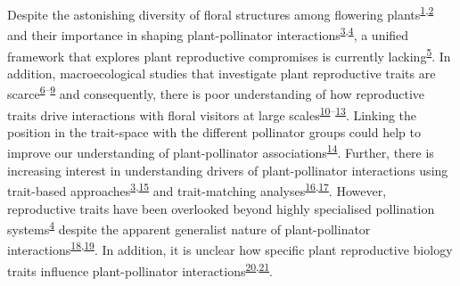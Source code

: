 \documentclass[12pt,a4paper,]{article}
\begin{document}
\doublespacing
\vspace{5mm} \normalsize

Despite the astonishing diversity of floral structures among flowering
plants\textsuperscript{\protect\hyperlink{ref-barrett2002}{1},\protect\hyperlink{ref-schiestl2013}{2}}
and their importance in shaping plant-pollinator
interactions\textsuperscript{\protect\hyperlink{ref-fenster2004}{3},\protect\hyperlink{ref-dellinger2020}{4}},
a unified framework that explores plant reproductive compromises is
currently lacking\textsuperscript{\protect\hyperlink{ref-roddy2021}{5}}.
In addition, macroecological studies that investigate plant reproductive
traits are
scarce\textsuperscript{\protect\hyperlink{ref-baude2016}{6}--\protect\hyperlink{ref-moeller2017}{9}}
and consequently, there is poor understanding of how reproductive traits
drive interactions with floral visitors at large
scales\textsuperscript{\protect\hyperlink{ref-sargent2008}{10}--\protect\hyperlink{ref-ruger2018}{13}}.
Linking the position in the trait-space with the different pollinator
groups could help to improve our understanding of plant-pollinator
associations\textsuperscript{\protect\hyperlink{ref-dehling2016}{14}}.
Further, there is increasing interest in understanding drivers of
plant-pollinator interactions using trait-based
approaches\textsuperscript{\protect\hyperlink{ref-fenster2004}{3},\protect\hyperlink{ref-rosas2014}{15}}
and trait-matching
analyses\textsuperscript{\protect\hyperlink{ref-stang2009}{16},\protect\hyperlink{ref-bartomeus2016}{17}}.
However, reproductive traits have been overlooked beyond highly
specialised pollination
systems\textsuperscript{\protect\hyperlink{ref-dellinger2020}{4}}
despite the apparent generalist nature of plant-pollinator
interactions\textsuperscript{\protect\hyperlink{ref-waser1996}{18},\protect\hyperlink{ref-olesen2002}{19}}.
In addition, it is unclear how specific plant reproductive biology
traits influence plant-pollinator
interactions\textsuperscript{\protect\hyperlink{ref-tur2013}{20},\protect\hyperlink{ref-devaux2014}{21}}.
\end{document}
